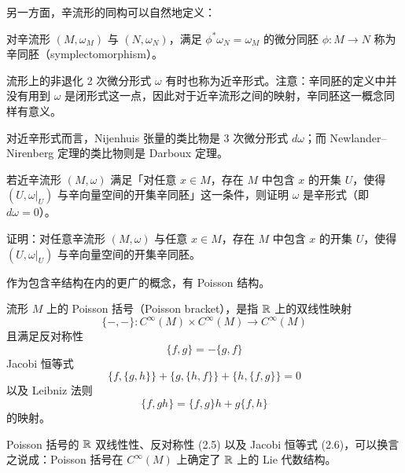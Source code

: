 另一方面，辛流形的同构可以自然地定义：

\begin{definition}
对辛流形 $(M,\omega_M)$ 与 $(N,\omega_N)$，满足 $\phi^*\omega_N=\omega_M$ 的微分同胚 $\phi\colon M\to N$ 称为辛同胚（symplectomorphism）。
\end{definition}

流形上的非退化 2 次微分形式 $\omega$ 有时也称为近辛形式。注意：辛同胚的定义中并没有用到 $\omega$ 是闭形式这一点，因此对于近辛流形之间的映射，辛同胚这一概念同样有意义。

对近辛形式而言，Nijenhuis 张量的类比物是 3 次微分形式 $d\omega$；而 Newlander–Nirenberg 定理的类比物则是 Darboux 定理。

\begin{exercise}
若近辛流形 $(M,\omega)$ 满足「对任意 $x\in M$，存在 $M$ 中包含 $x$ 的开集 $U$，使得 $(U,\omega|_U)$ 与辛向量空间的开集辛同胚」这一条件，则证明 $\omega$ 是辛形式（即 $d\omega=0$）。
\end{exercise}

\begin{exercise}[Darboux 定理]
证明：对任意辛流形 $(M,\omega)$ 与任意 $x\in M$，存在 $M$ 中包含 $x$ 的开集 $U$，使得 $(U,\omega|_U)$ 与辛向量空间的开集辛同胚。
\end{exercise}

作为包含辛结构在内的更广的概念，有 Poisson 结构。

\begin{definition}
流形 $M$ 上的 Poisson 括号（Poisson bracket），是指 $\mathbb{R}$ 上的双线性映射
\begin{equation}
    \{-,-\}\colon C^\infty(M)\times C^\infty(M)\to C^\infty(M) \tag{2.4}
\end{equation}
且满足反对称性
\begin{equation}
    \{f,g\}=-\{g,f\} \tag{2.5}
\end{equation}
Jacobi 恒等式
\begin{equation}
    \{f,\{g,h\}\}+\{g,\{h,f\}\}+\{h,\{f,g\}\}=0 \tag{2.6}
\end{equation}
以及 Leibniz 法则
\begin{equation}
    \{f,gh\}=\{f,g\}h+g\{f,h\} \tag{2.7}
\end{equation}
的映射。
\end{definition}

\begin{remark}
Poisson 括号的 $\mathbb{R}$ 双线性性、反对称性 (2.5) 以及 Jacobi 恒等式 (2.6)，可以换言之说成：Poisson 括号在 $C^\infty(M)$ 上确定了 $\mathbb{R}$ 上的 Lie 代数结构。
\end{remark}

